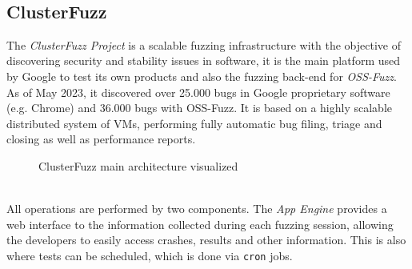 \documentclass[Lau,oneside]{sapthesis}%
\begin{document}
\ \\
\subsection{ClusterFuzz}
The \textit{ClusterFuzz Project} is a scalable fuzzing infrastructure with the objective of discovering security and stability issues in software, it is the main platform used by Google to test its own products and also the fuzzing back-end for \textit{OSS-Fuzz}.
\newline
As of May 2023, it discovered over 25.000 bugs in Google proprietary software (e.g. Chrome) and 36.000 bugs with OSS-Fuzz. \cite{ref:clusterfuzz_docs}
\newline \newline
It is based on a highly scalable distributed system of VMs, performing fully automatic bug filing, triage and closing as well as performance reports.
\newline \newline
\begin{figure}[h]
\caption{ClusterFuzz main architecture visualized \cite{ref:clusterfuzz_docs}}
\label{fig:clusterfuzz_architecture}
\end{figure}
\ \\
All operations are performed by two components.
\newline \newline
The \textit{App Engine} provides a web interface to the information collected during each fuzzing session, allowing the developers to easily access crashes, results and other information. This is also where tests can be scheduled, which is done via \verb|cron| jobs.
\newline \newline
\end{document}
